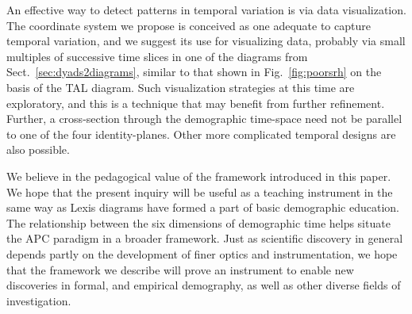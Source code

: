 \documentclass[12pt,oneside,a4paper,doublespacing]{article} %
\theoremstyle{definition}
\DeclareRobustCommand{\VAN}[3]{#2} %
\begin{document}
An effective way to detect patterns in temporal variation
is via data visualization. The coordinate system we propose is
conceived as one adequate to capture temporal variation, and we suggest its use
for visualizing data, probably via small multiples of successive time slices
in one of the diagrams from Sect.~\ref{sec:dyads2diagrams}, similar to that
shown in Fig.~\ref{fig:poorsrh} on the basis of the TAL diagram.
Such visualization strategies at this time are exploratory, and this is a
technique that may benefit from further refinement. Further, a cross-section
through the demographic time-space need not be parallel to one of the four
identity-planes. Other more complicated temporal designs are also possible.

We believe in the pedagogical value of the framework
introduced in this paper. We hope that the
present inquiry will be useful as a teaching instrument in the same way as Lexis
diagrams have formed a part of basic demographic education.
The relationship between the six dimensions of demographic time helps situate the APC
paradigm in a broader framework. Just as scientific discovery in general
depends partly on the development of finer optics and instrumentation, we hope
that the framework we describe will prove an instrument to enable new
discoveries in formal, and empirical demography, as well as other diverse fields of
investigation.

  \singlespacing
\DeclareRobustCommand{\VAN}[3]{#3}
 
%
 
%  
\end{document}
